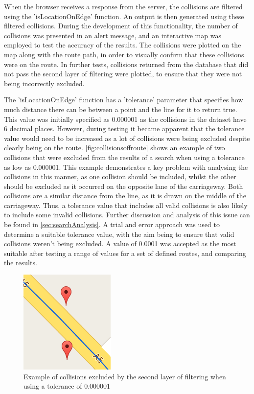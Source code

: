 \documentclass[authoryearcitations]{UoYCSproject}
\begin{document}
When the browser receives a response from the server, the collisions are filtered using the 'isLocationOnEdge' function. An output is then generated using these filtered collisions. During the development of this functionality, the number of collisions was presented in an alert message, and an interactive map was employed to test the accuracy of the results. The collisions were plotted on the map along with the route path, in order to visually confirm that these collisions were on the route. In further tests, collisions returned from the database that did not pass the second layer of filtering were plotted, to ensure that they were not being incorrectly excluded. 

The 'isLocationOnEdge' function has a 'tolerance' parameter that specifies how much distance there can be between a point and the line for it to return true. This value was initially specified as 0.000001 as the collisions in the dataset have 6 decimal places. However, during testing it became apparent that the tolerance value would need to be increased as a lot of collisions were being excluded despite clearly being on the route. \autoref{fig:collisionsoffroute} shows an example of two collisions that were excluded from the results of a search when using a tolerance as low as 0.000001. This example demonstrates a key problem with analysing the collisions in this manner, as one collision should be included, whilst the other should be excluded as it occurred on the opposite lane of the carriageway. Both collisions are a similar distance from the line, as it is drawn on the middle of the carriageway. Thus, a tolerance value that includes all valid collisions is also likely to include some invalid collisions. Further discussion and analysis of this issue can be found in \autoref{sec:searchAnalysis}. A trial and error approach was used to determine a suitable tolerance value, with the aim being to ensure that valid collisions weren't being excluded. A value of 0.0001 was accepted as the most suitable after testing a range of values for a set of defined routes, and comparing the results.

\begin{figure}
	\center
	\includegraphics[scale=0.8]{collisionoffroute}
	\caption{Example of collisions excluded by the second layer of filtering when using a tolerance of 0.000001}
	\label{fig:collisionsoffroute}
\end{figure}
\end{document}
